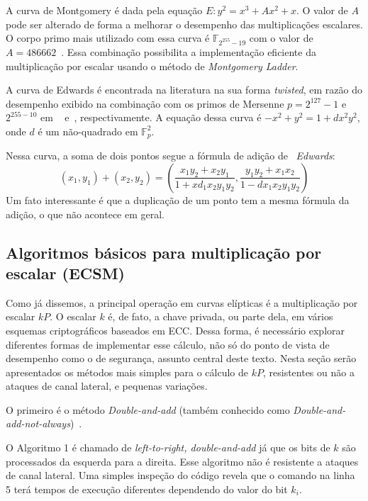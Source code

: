 \documentclass{SBCbookchapter}
\begin{document}
A curva de Montgomery é dada pela equação $E: y^2 = x^3 + Ax^2 + x$. O valor de $A$ pode ser alterado de forma a melhorar o desempenho das multiplicações escalares. O corpo primo mais utilizado com essa curva é $\mathbb{F}_{2^{255}-19}$ com o valor de $A = 486662$~\cite{Dull:2015:HCM:2834659.2834708}. Essa combinação possibilita a implementação eficiente da multiplicação por escalar usando o método de \emph{Montgomery Ladder}.

A curva de Edwards é encontrada na literatura na sua forma \emph{twisted}, em razão do desempenho exibido na combinação com os primos de Mersenne $p = 2^{127} - 1$ e $2^{255 - 10}$ em ~\cite{longa:2015} e~\cite{Bernstein2012}, respectivamente. A equação dessa curva é $-x^2 + y^2 = 1 + dx^2y^2$, onde $d$ é um não-quadrado em $\mathbb{F}_p^2$.

Nessa curva, a soma de dois pontos segue a fórmula de adição de ~\emph{Edwards}:
$$ (x_1,y_1) + (x_2,y_2) = (\frac{x_1y_2 + x_2y_1}{1 + xd_1x_2y_1y_2},\frac{y_1y_2 + x_1x_2}{1 - dx_1x_2y_1y_2}) $$
Um fato interessante é que a duplicação de um ponto tem a mesma fórmula da adição, o que não acontece em geral.

\subsection{Algoritmos básicos para multiplicação por escalar (ECSM)}

Como já dissemos, a principal operação em curvas elípticas é a multiplicação por escalar $kP$. O escalar $k$ é, de fato, a chave privada, ou parte dela, em vários esquemas criptográficos baseados em ECC. Dessa forma, é necessário explorar diferentes formas de implementar esse cálculo, não só do ponto de vista de desempenho como o de segurança, assunto central deste texto. Nesta seção serão apresentados os métodos mais simples para o cálculo de $kP$, resistentes ou não a ataques de canal lateral, e pequenas variações.

O primeiro é o método \textit{Double-and-add} (também conhecido como \textit{Double-and-add-not-always})~\cite{DBLP:journals/iacr/Rivain11}. 

O Algoritmo 1 é chamado de \textit{left-to-right, double-and-add} já que os bits de $k$ são processados da esquerda para a direita. Esse algoritmo não é resistente a ataques de canal lateral. Uma simples inspeção do código revela que o comando na linha 5 terá tempos de execução diferentes dependendo do valor do bit $k_i$. 
\end{document}
